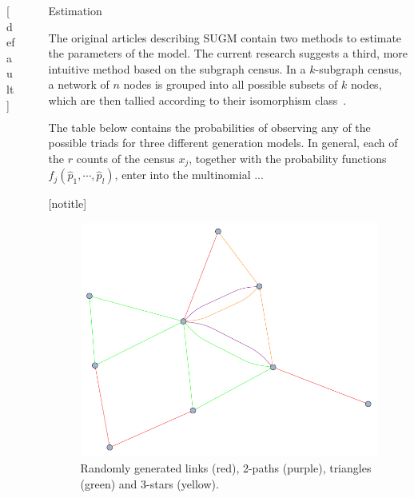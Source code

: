 \documentclass[final]{beamer}
\newlength{\sepwid}
\newlength{\onecolwid}
\newlength{\threecolwid}
\begin{document}
\begin{frame}[t]
\begin{columns}[t]
\begin{column}{\threecolwid}
\begin{columns}[t,totalwidth=\threecolwid]
\begin{column}{\onecolwid}
\begin{block}
\end{block}
[default]

\end{column} %

\begin{column}{\sepwid}\end{column} %

\begin{column}{\onecolwid}\vspace{-.6in} %

\begin{block}{Estimation}

The original articles describing SUGM contain two methods to estimate the parameters of the model. The current research suggests a third, more intuitive method based on the subgraph census. In a $k$-subgraph census, a network of $n$ nodes is grouped into all possible subsets of $k$ nodes, which are then tallied according to their isomorphism class~\cite{Davis1972,Holland1970,Holland1976}.

The table below contains the probabilities of observing any of the possible triads for three different generation models. In general, each of the $r$ counts of the census $x_{j}$, together with the probability functions $f_{j}(\hat{p}_{1},\cdots,\hat{p}_{l})$, enter into the multinomial ...

\end{block}

[notitle]
\begin{block}

\begin{figure}
\includegraphics[width=0.8\linewidth]{../Figure02_2.pdf}
\caption{\hspace{3mm}Randomly generated links (red), 2-paths (purple), triangles (green) and 3-stars (yellow).}
\label{fig:Figure02}
\end{figure}


\end{block}
\end{column}
\end{columns}
\end{column}
\end{columns}
\end{frame}
\end{document}

